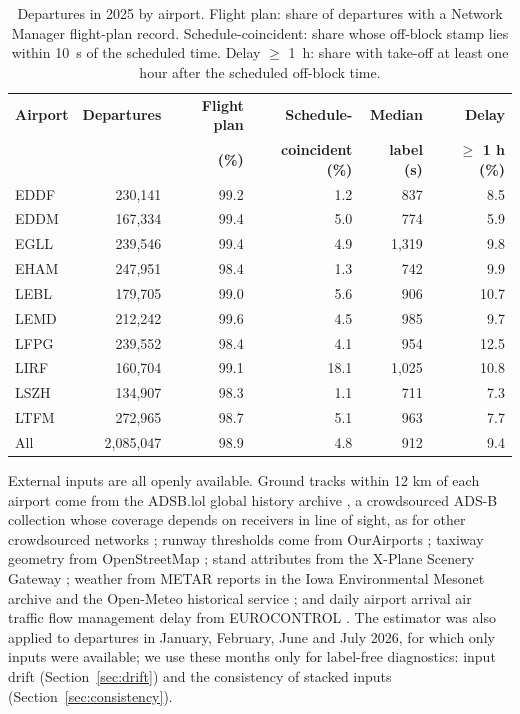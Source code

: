 \documentclass[
  manuscript=article,  %
  layout=preprint,  %
  year=20xx,
  volume=x,
]{extra/joas}
\begin{document}
\begin{table}[htbp!]
  \centering
  \small
  \caption{Departures in 2025 by airport. Flight plan: share of departures with a Network Manager flight-plan record. Schedule-coincident: share whose off-block stamp lies within 10~s of the scheduled time. Delay $\geq$ 1~h: share with take-off at least one hour after the scheduled off-block time.}
  \label{tb:airports}
  \begin{tabular}{lrrrrr}
  \toprule
  \textbf{Airport} & \textbf{Departures} & \textbf{Flight plan} & \textbf{Schedule-} & \textbf{Median} & \textbf{Delay} \\
  & & \textbf{(\%)} & \textbf{coincident (\%)} & \textbf{label (s)} & \textbf{$\geq$ 1 h (\%)} \\
  \midrule
  EDDF & 230,141 & 99.2 & 1.2 & 837 & 8.5 \\
  EDDM & 167,334 & 99.4 & 5.0 & 774 & 5.9 \\
  EGLL & 239,546 & 99.4 & 4.9 & 1,319 & 9.8 \\
  EHAM & 247,951 & 98.4 & 1.3 & 742 & 9.9 \\
  LEBL & 179,705 & 99.0 & 5.6 & 906 & 10.7 \\
  LEMD & 212,242 & 99.6 & 4.5 & 985 & 9.7 \\
  LFPG & 239,552 & 98.4 & 4.1 & 954 & 12.5 \\
  LIRF & 160,704 & 99.1 & 18.1 & 1,025 & 10.8 \\
  LSZH & 134,907 & 98.3 & 1.1 & 711 & 7.3 \\
  LTFM & 272,965 & 98.7 & 5.1 & 963 & 7.7 \\
  \midrule
  All & 2,085,047 & 98.9 & 4.8 & 912 & 9.4 \\
  \bottomrule
  \end{tabular}
\end{table}

External inputs are all openly available. Ground tracks within 12 km of each airport come from the ADSB.lol global history archive \cite{adsblol2026historical}, a crowdsourced ADS-B collection whose coverage depends on receivers in line of sight, as for other crowdsourced networks \cite{schafer2014bringing,strohmeier2021crowdsourced}; runway thresholds come from OurAirports \cite{ourairports2026open}; taxiway geometry from OpenStreetMap \cite{haklay2008openstreetmap}; stand attributes from the X-Plane Scenery Gateway \cite{xplane2026scenery}; weather from METAR reports in the Iowa Environmental Mesonet archive \cite{iem2026download} and the Open-Meteo historical service \cite{zippenfenig2023openmeteo}; and daily airport arrival air traffic flow management delay from EUROCONTROL \cite{eurocontrol2026airport}. The estimator was also applied to departures in January, February, June and July 2026, for which only inputs were available; we use these months only for label-free diagnostics: input drift (Section~\ref{sec:drift}) and the consistency of stacked inputs (Section~\ref{sec:consistency}).
\end{document}
